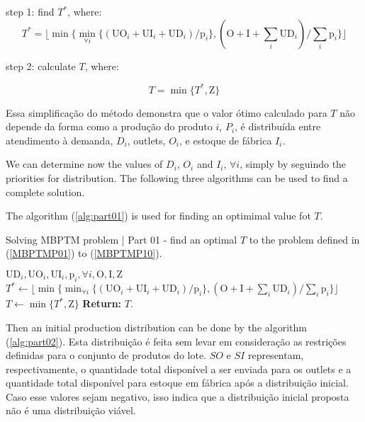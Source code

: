 \documentclass[authoryear,manuscript,12pt]{elsarticle}
\begin{document}
step 1: find $T^*$, where:
\begin{equation}
T^* = \lfloor{\min \{\min_{\forall i} \{(\textrm{UO}_i + \textrm{UI}_i + \textrm{UD}_i) / \textrm{p}_i\},(\textrm{O} + \textrm{I} + \sum_i \textrm{UD}_i) / \sum_i {\textrm{p}_i}\}}\rfloor
\end{equation}

step 2: calculate $T$, where: 

\begin{equation}
T = \min \{T^* , \textrm{Z}\}
\end{equation}

Essa simplificação do método demonstra que o valor ótimo calculado para $T$ não depende da forma como a produção do produto $i$, $P_i$, é distribuída entre atendimento à demanda, $D_i$, outlets, $O_i$, e estoque de fábrica $I_i$. 

We can determine now the values of $D_i$, $O_i$ and $I_i$, $\forall i$, simply by seguindo the priorities for distribution. The following three algorithms can be used to find a complete solution.

The algorithm (\ref{alg:part01}) is used for finding an optimimal value fot $T$.

\begin{algorithm}
\caption{Solving MBPTM problem | Part 01 - find an optimal $T$ to the problem defined in (\ref{MBPTMP01}) to (\ref{MBPTMP10}).}\label{alg:part01}
\begin{algorithmic}
	\Require $\textrm{UD}_i, \textrm{UO}_i, \textrm{UI}_i, \textrm{p}_i, \forall i, \textrm{O}, \textrm{I}, \textrm{Z}$
	\State $T^* \gets \lfloor{\min \{\min_{\forall i} \{(\textrm{UO}_i + \textrm{UI}_i + \textrm{UD}_i) / \textrm{p}_i\},(\textrm{O} + \textrm{I} + \sum_i \textrm{UD}_i) / \sum_i {\textrm{p}_i}\}}\rfloor$
	\State $T \gets \min \{T^* , \textrm{Z}\}$
\State \textbf{Return:} $T$.
\end{algorithmic}
\end{algorithm}

Then an initial production distribution can be done by the algorithm (\ref{alg:part02}). Esta distribuição é feita sem levar em consideração as restrições definidas para o conjunto de produtos do lote. $SO$ e $SI$ representam, respectivamente, o quantidade total disponível a ser enviada para os outlets e a quantidade total disponível para estoque em fábrica após a distribuição inicial. Caso esse valores sejam negativo, isso indica que a distribuição inicial proposta não é uma distribuição viável.
\end{document}
